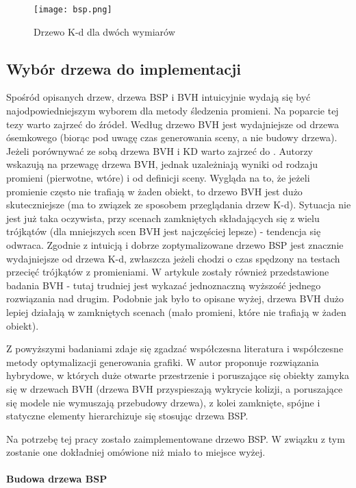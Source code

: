 \begin{figure}[h!]
\centering
  \caption{Drzewo K-d dla dwóch wymiarów}
  \texttt{[image: bsp.png]}
\end{figure}


\subsection{Wybór drzewa do implementacji}

Spośród opisanych drzew, drzewa BSP i BVH intuicyjnie wydają się być najodpowiedniejszym wyborem dla metody śledzenia promieni. Na poparcie tej tezy warto zajrzeć do źródeł. Według \cite{bvhvsoctee} drzewo BVH jest wydajniejsze od drzewa ósemkowego (biorąc pod uwagę czas generowania sceny, a nie budowy drzewa). Jeżeli porównywać ze sobą drzewa BVH i KD warto zajrzeć do \cite{bvhvskd1, bvhvskd2}. Autorzy wskazują na przewagę drzewa BVH, jednak uzależniają wyniki od rodzaju promieni (pierwotne, wtóre) i od definicji sceny. Wygląda na to, że jeżeli promienie często nie trafiają w żaden obiekt, to drzewo BVH jest dużo skuteczniejsze (ma to związek ze sposobem przeglądania drzew K-d). Sytuacja nie jest już taka oczywista, przy scenach zamkniętych składających się z wielu trójkątów (dla mniejszych scen BVH jest najczęściej lepsze) - tendencja się odwraca. Zgodnie z intuicją i \cite{bspvskd} dobrze zoptymalizowane drzewo BSP jest znacznie wydajniejsze od drzewa K-d, zwłaszcza jeżeli chodzi o czas spędzony na testach przecięć trójkątów z promieniami. W artykule zostały również przedstawione badania BVH - tutaj trudniej jest wykazać jednoznaczną wyższość jednego rozwiązania nad drugim. Podobnie jak było to opisane wyżej, drzewa BVH dużo lepiej działają w zamkniętych scenach (mało promieni, które nie trafiają w żaden obiekt). 

Z powyższymi badaniami zdaje się zgadzać współczesna literatura i współczesne metody optymalizacji generowania grafiki. W \cite{trees} autor proponuje rozwiązania hybrydowe, w których duże otwarte przestrzenie i poruszające się obiekty zamyka się w drzewach BVH (drzewa BVH przyspieszają wykrycie kolizji, a poruszające się modele nie wymuszają przebudowy drzewa), z kolei zamknięte, spójne i statyczne elementy hierarchizuje się stosując drzewa BSP.

Na potrzebę tej pracy zostało zaimplementowane drzewo BSP. W związku z tym zostanie one dokładniej omówione niż miało to miejsce wyżej.

\paragraph{Budowa drzewa BSP}

